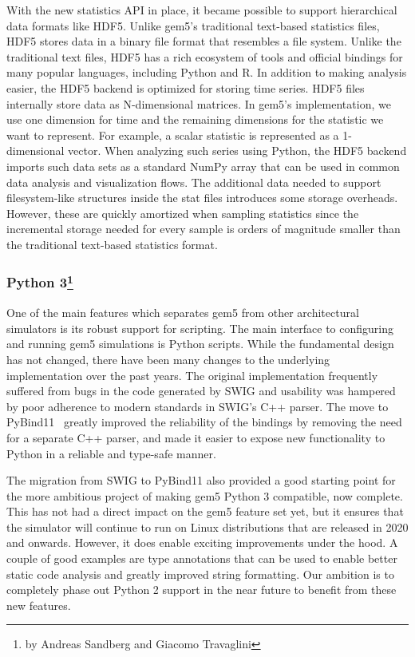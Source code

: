 With the new statistics API in place, it became possible to support hierarchical data formats like HDF5.
Unlike gem5's traditional text-based statistics files, HDF5 stores data in a binary file format that resembles a file system.
Unlike the traditional text files, HDF5 has a rich ecosystem of tools and official bindings for many popular languages, including Python and R.
 In addition to making analysis easier, the HDF5 backend is optimized for storing time series.
HDF5 files internally store data as N-dimensional matrices.
In gem5's implementation, we use one dimension for time and the remaining dimensions for the statistic we want to represent.
For example, a scalar statistic is represented as a 1-dimensional vector.
When analyzing such series using Python, the HDF5 backend imports such data sets as a standard NumPy array that can be used in common data analysis and visualization flows.
The additional data needed to support filesystem-like structures inside the stat files introduces some storage overheads.
However, these are quickly amortized when sampling statistics since the incremental storage needed for every sample is orders of magnitude smaller than the traditional text-based statistics format.

\subsubsection[Python 3]{Python 3\footnote{by Andreas Sandberg and Giacomo Travaglini}}

One of the main features which separates gem5 from other architectural simulators is its robust support for scripting.
The main interface to configuring and running gem5 simulations is Python scripts.
While the fundamental design has not changed, there have been many changes to the underlying implementation over the past years.
The original implementation frequently suffered from bugs in the code generated by SWIG and usability was hampered by poor adherence to modern standards in SWIG's C++ parser.
The move to PyBind11~\cite{} greatly improved the reliability of the bindings by removing the need for a separate C++ parser, and made it easier to expose new functionality to Python in a reliable and type-safe manner.

The migration from SWIG to PyBind11 also provided a good starting point for the more ambitious project of making gem5 Python 3 compatible, now complete.
This has not had a direct impact on the gem5 feature set yet, but it ensures that the simulator will continue to run on Linux distributions that are released in 2020 and onwards.
However, it does enable exciting improvements under the hood.
A couple of good examples are type annotations that can be used to enable better static code analysis and greatly improved string formatting.
Our ambition is to completely phase out Python 2 support in the near future to benefit from these new features.

